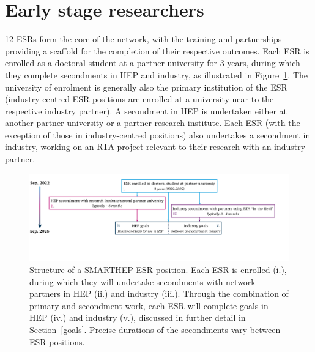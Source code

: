 \section{Early stage researchers}
\label{esrs}
12 ESRs form the core of the network, with the training and partnerships providing a scaffold for the completion of their respective outcomes. Each ESR is enrolled as a doctoral student at a partner university for 3 years, during which they complete secondments in HEP and industry, as illustrated in Figure~\ref{esr-diagram}. The university of enrolment is generally also the primary institution of the ESR (industry-centred ESR positions are enrolled at a university near to the respective industry partner). A secondment in HEP is undertaken either at another partner university or a partner research institute. Each ESR (with the exception of those in industry-centred positions) also undertakes a secondment in industry, working on an RTA project relevant to their research with an industry partner.\par

\begin{figure}[h!]
    \centering
    \includegraphics[width=\linewidth,clip]{figures/esr-diagram.pdf}
    \caption{Structure of a SMARTHEP ESR position. Each ESR is enrolled (i.), during which they will undertake secondments with network partners in HEP (ii.) and industry (iii.). Through the combination of primary and secondment work, each ESR will complete goals in HEP (iv.) and industry (v.), discussed in further detail in Section~\ref{goals}. Precise durations of the secondments vary between ESR positions.}
    \label{esr-diagram}       %
\end{figure}

